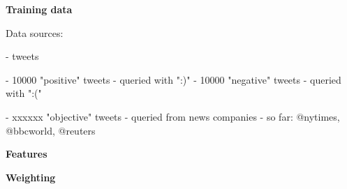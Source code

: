 



\textbf{Training data}

Data sources:

- tweets

- 10000 "positive" tweets - queried with ":)"
- 10000 "negative" tweets - queried with ":("

- xxxxxx "objective" tweets - queried from news companies - so far: @nytimes, @bbcworld, @reuters


\textbf{Features}





\textbf{Weighting}





